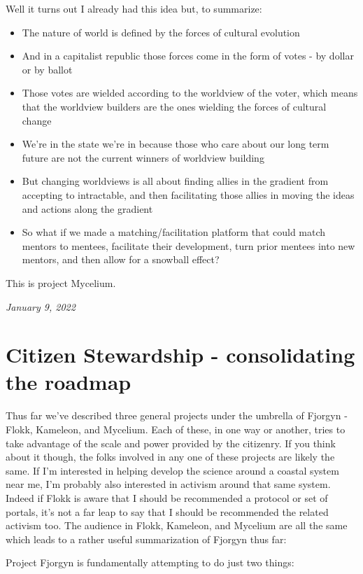 \documentclass[10pt,a5paper]{book}
\begin{document}
Well it turns out I already had this idea but, to summarize:
\begin{itemize}
\item The nature of world is defined by the forces of cultural evolution
\item And in a capitalist republic those forces come in the form of votes - by dollar or by ballot
\item Those votes are wielded according to the worldview of the voter, which means that the worldview builders are the ones wielding the forces of cultural change
\item We're in the state we're in because those who care about our long term future are not the current winners of worldview building
\item But changing worldviews is all about finding allies in the gradient from accepting to intractable, and then facilitating those allies in moving the ideas and actions along the gradient
\item So what if we made a matching/facilitation platform that could match mentors to mentees, facilitate their development, turn prior mentees into new mentors, and then allow for a snowball effect?
\end{itemize}

This is project Mycelium.


\textit{January 9, 2022}


\section{Citizen Stewardship - consolidating the roadmap}

Thus far we've described three general projects under the umbrella of Fjorgyn - Flokk, Kameleon, and Mycelium. Each of these, in one way or another, tries to take advantage of the scale and power provided by the citizenry. If you think about it though, the folks involved in any one of these projects are likely the same. If I'm interested in helping develop the science around a coastal system near me, I'm probably also interested in activism around that same system. Indeed if Flokk is aware that I should be recommended a protocol or set of portals, it's not a far leap to say that I should be recommended the related activism too. The audience in Flokk, Kameleon, and Mycelium are all the same which leads to a rather useful summarization of Fjorgyn thus far:

Project Fjorgyn is fundamentally attempting to do just two things:
\end{document}

